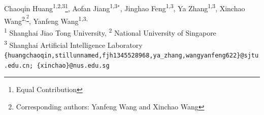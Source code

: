 Chaoqin Huang\textsuperscript{1,2,3}\thanks{Equal Contribution},
Aofan Jiang\textsuperscript{1,3}$^*$,
Jinghao Feng\textsuperscript{1,3},
Ya Zhang\textsuperscript{1,3},
Xinchao Wang\textsuperscript{2,\thanks{Corresponding authors: Yanfeng Wang and Xinchao Wang}},
Yanfeng Wang\textsuperscript{1,3,\samethanks}\\
  \textsuperscript{1} Shanghai Jiao Tong University, \textsuperscript{2} National University of Singapore \\ \textsuperscript{3} Shanghai Artificial Intelligence Laboratory\\
\tt\scriptsize \{huangchaoqin,stillunnamed,fjh1345528968,ya\_zhang,wangyanfeng622\}@sjtu.edu.cn; 
\{xinchao\}@nus.edu.sg

